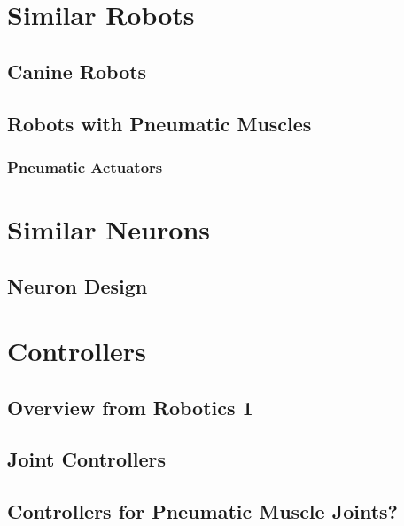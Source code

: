 \section{Similar Robots}

\subsection{Canine Robots}

\subsection{Robots with Pneumatic Muscles}

\subsubsection{Pneumatic Actuators}

\cite{einstein}

\section{Similar Neurons}

\subsection{Neuron Design}

\section{Controllers}

\subsection{Overview from Robotics 1}

\subsection{Joint Controllers}

\subsection{Controllers for Pneumatic Muscle Joints?}

